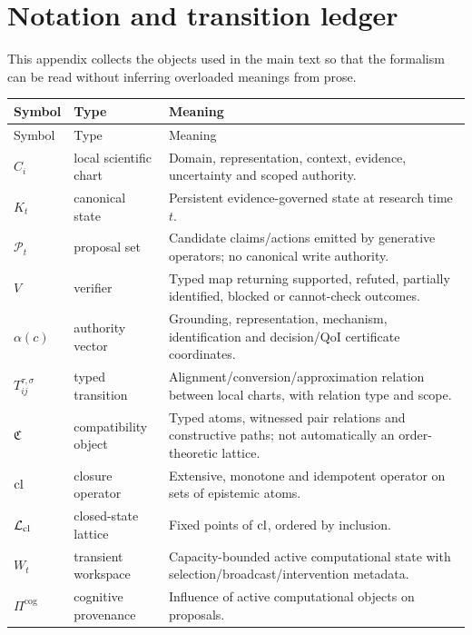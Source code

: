 \appendix

\section{Notation and transition ledger}

This appendix collects the objects used in the main text so that the formalism can be read without inferring overloaded meanings from prose.

\begin{longtable}{>{\raggedright\arraybackslash}p{} >{\raggedright\arraybackslash}p{} >{\raggedright\arraybackslash}p{}}
\toprule
Symbol & Type & Meaning \\
\midrule
\endfirsthead
\toprule
Symbol & Type & Meaning \\
\midrule
\endhead
\(C_i\) & local scientific chart & Domain, representation, context, evidence, uncertainty and scoped authority. \\
\(K_t\) & canonical state & Persistent evidence-governed state at research time \(t\). \\
\(\mathcal P_t\) & proposal set & Candidate claims/actions emitted by generative operators; no canonical write authority. \\
\(V\) & verifier & Typed map returning supported, refuted, partially identified, blocked or cannot-check outcomes. \\
\(\alpha(c)\) & authority vector & Grounding, representation, mechanism, identification and decision/QoI certificate coordinates. \\
\(T_{ij}^{\tau,\sigma}\) & typed transition & Alignment/conversion/approximation relation between local charts, with relation type and scope. \\
\(\mathfrak C\) & compatibility object & Typed atoms, witnessed pair relations and constructive paths; not automatically an order-theoretic lattice. \\
\(\operatorname{cl}\) & closure operator & Extensive, monotone and idempotent operator on sets of epistemic atoms. \\
\(\mathcal L_{\operatorname{cl}}\) & closed-state lattice & Fixed points of \(\operatorname{cl}\), ordered by inclusion. \\
\(W_t\) & transient workspace & Capacity-bounded active computational state with selection/broadcast/intervention metadata. \\
\(\Pi^{\mathrm{cog}}\) & cognitive provenance & Influence of active computational objects on proposals. \\

\end{longtable}
